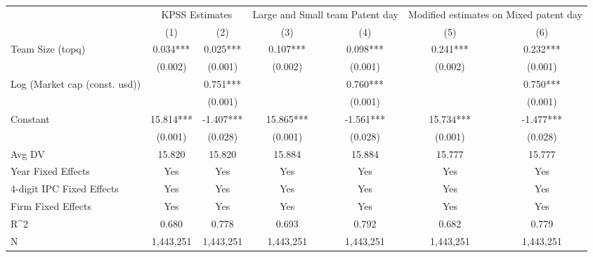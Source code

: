 {
\def\sym#1{\ifmmode^{#1}\else\(^{#1}\)\fi}
\begin{tabular}{l*{6}{c}}
\hline\hline
                    &\multicolumn{2}{c}{KPSS Estimates}&\multicolumn{2}{c}{Large and Small team Patent day}&\multicolumn{2}{c}{Modified estimates on Mixed patent day }\\\cmidrule(lr){2-3}\cmidrule(lr){4-5}\cmidrule(lr){6-7}
                    &\multicolumn{1}{c}{(1)}   &\multicolumn{1}{c}{(2)}   &\multicolumn{1}{c}{(3)}   &\multicolumn{1}{c}{(4)}   &\multicolumn{1}{c}{(5)}   &\multicolumn{1}{c}{(6)}   \\
\hline
Team Size (topq)    &       0.034***&       0.025***&       0.107***&       0.098***&       0.241***&       0.232***\\
                    &     (0.002)   &     (0.001)   &     (0.002)   &     (0.001)   &     (0.002)   &     (0.001)   \\
Log (Market cap (const. usd))&               &       0.751***&               &       0.760***&               &       0.750***\\
                    &               &     (0.001)   &               &     (0.001)   &               &     (0.001)   \\
Constant            &      15.814***&      -1.407***&      15.865***&      -1.561***&      15.734***&      -1.477***\\
                    &     (0.001)   &     (0.028)   &     (0.001)   &     (0.028)   &     (0.001)   &     (0.028)   \\
\hline
Avg DV              &      15.820   &      15.820   &      15.884   &      15.884   &      15.777   &      15.777   \\
Year Fixed Effects  &         Yes   &         Yes   &         Yes   &         Yes   &         Yes   &         Yes   \\
4-digit IPC Fixed Effects&         Yes   &         Yes   &         Yes   &         Yes   &         Yes   &         Yes   \\
Firm Fixed Effects  &         Yes   &         Yes   &         Yes   &         Yes   &         Yes   &         Yes   \\
R^2                 &       0.680   &       0.778   &       0.693   &       0.792   &       0.682   &       0.779   \\
N                   &   1,443,251   &   1,443,251   &   1,443,251   &   1,443,251   &   1,443,251   &   1,443,251   \\
\hline\hline
\end{tabular}
}
